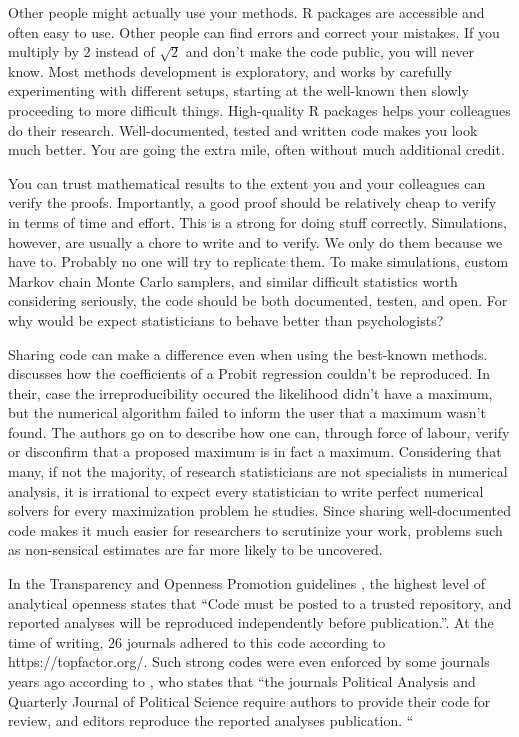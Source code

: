 Other people might actually use your methods. R packages are accessible
and often easy to use. Other people can find errors and correct your
mistakes. If you multiply by $2$ instead of $\sqrt{2}$ and don't
make the code public, you will never know. Most methods development
is exploratory, and works by carefully experimenting with different
setups, starting at the well-known then slowly proceeding to more
difficult things. High-quality R packages helps your colleagues do
their research. Well-documented, tested and written code makes you
look much better. You are going the extra mile, often without much
additional credit. 

You can trust mathematical results to the extent you and your colleagues
can verify the proofs. Importantly, a good proof should be relatively
cheap to verify in terms of time and effort. This is a strong for
doing stuff correctly. Simulations, however, are usually a chore to
write and to verify. We only do them because we have to. Probably
no one will try to replicate them. To make simulations, custom Markov
chain Monte Carlo samplers, and similar difficult statistics worth
considering seriously, the code should be both documented, testen,
and open. For why would be expect statisticians to behave better than
psychologists? 

Sharing code can make a difference even when using the best-known
methods. \cite{McCullough2003-zd} discusses how the coefficients
of a Probit regression couldn't be reproduced. In their, case the
irreproducibility occured the likelihood didn't have a maximum, but
the numerical algorithm failed to inform the user that a maximum wasn't
found. The authors go on to describe how one can, through force of
labour, verify or disconfirm that a proposed maximum is in fact a
maximum. Considering that many, if not the majority, of research statisticians
are not specialists in numerical analysis, it is irrational to expect
every statistician to write perfect numerical solvers for every maximization
problem he studies. Since sharing well-documented code makes it much
easier for researchers to scrutinize your work, problems such as non-sensical
estimates are far more likely to be uncovered.

In the Transparency and Openness Promotion guidelines \parencite{Nosek2015-hh},
the highest level of analytical openness states that ``Code must
be posted to a trusted repository, and reported analyses will be reproduced
independently before publication.''. At the time of writing, 26 journals
adhered to this code according to https://topfactor.org/. Such strong
codes were even enforced by some journals years ago according to \cite{Nosek2015-hh},
who states that ``the journals Political Analysis and Quarterly Journal
of Political Science require authors to provide their code for review,
and editors reproduce the reported analyses publication. ``

